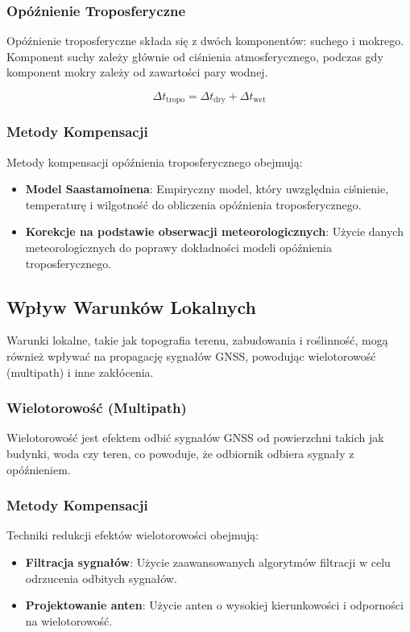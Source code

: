 \subsubsection{Opóźnienie Troposferyczne}
Opóźnienie troposferyczne składa się z dwóch komponentów: suchego i mokrego. Komponent suchy zależy głównie od ciśnienia atmosferycznego, podczas gdy komponent mokry zależy od zawartości pary wodnej.

\[
\Delta t_{\text{tropo}} = \Delta t_{\text{dry}} + \Delta t_{\text{wet}}
\]

\subsubsection{Metody Kompensacji}
Metody kompensacji opóźnienia troposferycznego obejmują:
\begin{itemize}
    \item \textbf{Model Saastamoinena}: Empiryczny model, który uwzględnia ciśnienie, temperaturę i wilgotność do obliczenia opóźnienia troposferycznego.
    \item \textbf{Korekcje na podstawie obserwacji meteorologicznych}: Użycie danych meteorologicznych do poprawy dokładności modeli opóźnienia troposferycznego.
\end{itemize}

\subsection{Wpływ Warunków Lokalnych}
Warunki lokalne, takie jak topografia terenu, zabudowania i roślinność, mogą również wpływać na propagację sygnałów GNSS, powodując wielotorowość (multipath) i inne zakłócenia.

\subsubsection{Wielotorowość (Multipath)}
Wielotorowość jest efektem odbić sygnałów GNSS od powierzchni takich jak budynki, woda czy teren, co powoduje, że odbiornik odbiera sygnały z opóźnieniem.

\subsubsection{Metody Kompensacji}
Techniki redukcji efektów wielotorowości obejmują:
\begin{itemize}
    \item \textbf{Filtracja sygnałów}: Użycie zaawansowanych algorytmów filtracji w celu odrzucenia odbitych sygnałów.
    \item \textbf{Projektowanie anten}: Użycie anten o wysokiej kierunkowości i odporności na wielotorowość.
\end{itemize}
